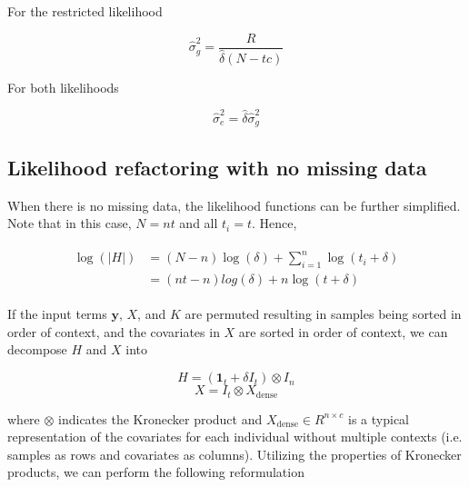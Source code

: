         \noindent For the restricted likelihood
        
        \begin{equation}
            \hat{\sigma}_g^2 = \frac{R}{\hat{\delta}(N-tc)}
        \end{equation}
        
        \noindent For both likelihoods
        
        \begin{equation}
            \hat{\sigma}_e^2 = \hat{\delta}\hat{\sigma}_g^2
        \end{equation}
    \subsection{Likelihood refactoring with no missing data}
    
        When there is no missing data, the likelihood functions can be further simplified. Note that in this case, $N = nt$ and all $t_i = t$. Hence,
        
        \begin{align}
        \begin{split}
            \log{(|H|)} & = (N-n)\log{(\delta)} + \sum_{i=1}^n \log{(t_i + \delta)} \\
                        & = (nt-n)log{(\delta)} + n\log{(t + \delta)}
        \end{split}
        \end{align}
        
        If the input terms $\mathbf{y}$, $X$, and $K$ are permuted resulting in samples being sorted in order of context, and the covariates in $X$ are sorted in order of context, we can decompose $H$ and $X$ into
        
        \begin{equation}
            H = (\mathbf{1}_{t} + \delta I_t) \otimes I_n 
        \end{equation}
        \begin{equation}
            X = I_t \otimes X_{\text{dense}}
        \end{equation}
        
        \noindent where $\otimes$ indicates the Kronecker product and $X_{\text{dense}} \in R^{n \times c}$ is a typical representation of the covariates for each individual without multiple contexts (i.e. samples as rows and covariates as columns). Utilizing the properties of Kronecker products, we can perform the following reformulation

